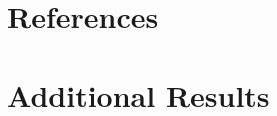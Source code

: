 \documentclass{article}
\theoremstyle{definition}
\newtheorem{definition}[theorem]{Definition}
\newtheorem{example}[theorem]{Example}
\begin{document}

\section{References}

% 
% 
\section{Additional Results}
\end{document}

